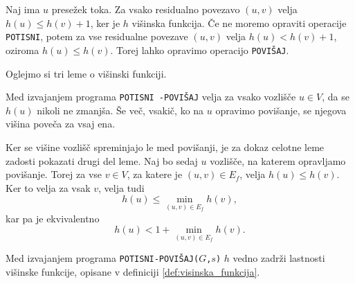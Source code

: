 \documentclass[mat1]{fmfdelo}
\begin{document}
\begin{dokaz}
Naj ima $u$ presežek toka. Za vsako residualno povezavo $(u,v)$ velja $h(u) \leq h(v) + 1$, ker je $h$ višinska funkcija. Če ne moremo opraviti operacije \texttt{POTISNI}, potem za vse residualne povezave $(u,v)$ velja $h(u) < h(v)+1$, oziroma $h(u) \leq h(v)$. Torej lahko opravimo operacijo \texttt{POVIŠAJ}.
\end{dokaz}

Oglejmo si tri leme o višinski funkciji.

\begin{lema}\label{lem:visina_ne_pada}
Med izvajanjem programa \texttt{POTISNI -POVIŠAJ} velja za vsako vozlišče $u \in V$, da se $h(u)$ nikoli ne zmanjša. Še več, vsakič, ko na $u$ opravimo povišanje, se njegova višina poveča za vsaj ena.
\end{lema}

\begin{dokaz}
Ker se višine vozlišč spreminjajo le med povišanji, je za dokaz celotne leme zadosti pokazati drugi del leme. Naj bo sedaj $u$ vozlišče, na katerem opravljamo povišanje. Torej za vse $v \in V$, za katere je $(u,v) \in E_f$, velja $h(u) \leq h(v)$. Ker to velja za vsak $v$, velja tudi \[h(u) \leq \min_{(u,v) \in E_f} h(v),\] kar pa je ekvivalentno \[h(u) < 1 + \min_{(u,v) \in E_f} h(v).\]
\end{dokaz}

\begin{lema}\label{lem:h_ostane_visinska}
Med izvajanjem programa \texttt{POTISNI-POVIŠAJ($G$,$s$)} $h$ vedno zadrži lastnosti višinske funkcije, opisane v definiciji \ref{def:visinska_funkcija}.
\end{lema}
\end{document}
